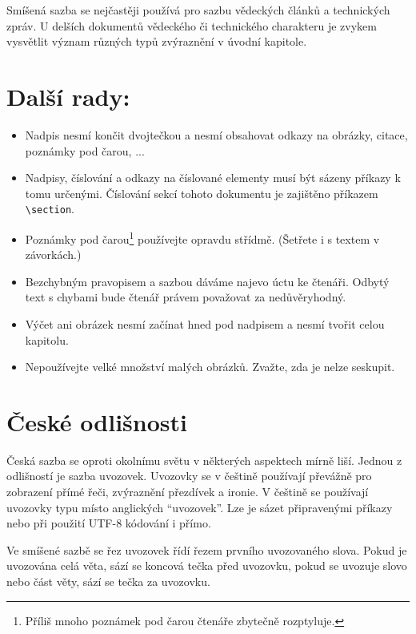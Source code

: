 \documentclass[10pt, a4paper, twocolumn]{article}
\begin{document}
Smíšená sazba se nejčastěji používá pro sazbu vědeckých článků a technických zpráv.
U delších dokumentů vědeckého či technického charakteru je zvykem vysvětlit význam různých typů zvýraznění v úvodní kapitole.


\hypertarget{third}{\section{Další rady:}}
\begin{itemize}
     
    \item Nadpis nesmí končit dvojtečkou a nesmí obsahovat odkazy na obrázky, citace, poznámky pod čarou, ...
    \item Nadpisy, číslování a odkazy na číslované elementy musí být sázeny příkazy k tomu určenými.
        Číslování sekcí tohoto dokumentu je zajištěno příkazem \texttt{\textbackslash section}.
    \item Poznámky pod čarou\footnote{Příliš mnoho poznámek pod čarou čtenáře zbytečně rozptyluje.} používejte opravdu střídmě.
        (Šetřete i s textem v závorkách.)
    \item Bezchybným pravopisem a sazbou dáváme najevo úctu ke čtenáři.
        Odbytý text s chybami bude čtenář právem považovat za nedůvěryhodný.
    \item Výčet ani obrázek nesmí začínat hned pod nadpisem a nesmí tvořit celou kapitolu.
    \item Nepoužívejte velké množství malých obrázků.
        Zvažte, zda je nelze seskupit.

\end{itemize}





\section{České odlišnosti}

Česká sazba se oproti okolnímu světu v některých aspektech mírně liší.
Jednou z odlišností je sazba uvozovek.
Uvozovky se v češtině používají převážně pro zobrazení přímé řeči, zvýraznění přezdívek a ironie.
V češtině se používají uvozovky typu  místo anglických ``uvozovek''.
Lze je sázet připravenými příkazy nebo při použití UTF-8 kódování i přímo.

Ve smíšené sazbě se řez uvozovek řídí řezem prvního uvozovaného slova.
Pokud je uvozována celá věta, sází se koncová tečka před uvozovku, pokud se uvozuje slovo nebo část věty, sází se tečka za uvozovku.
\end{document}
